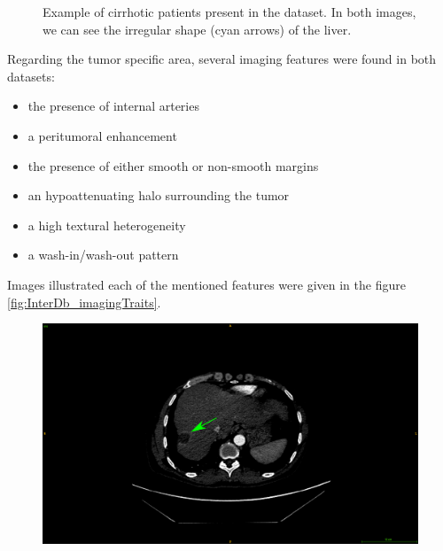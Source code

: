{\begin{figure}[!ht]
\begin{mdframed}[backgroundcolor=blue!50,linecolor=blue!50]
\begin{minipage}{0.45\linewidth}
		\end{minipage}
	\end{mdframed}
	\caption{Example of cirrhotic patients present in the \textbf{} dataset. In both images, we can see the irregular shape (cyan arrows) of the liver.}
	\label{fig:GDb_diseasedLivers}
\end{figure}
Regarding the tumor specific area, several imaging features were found in both datasets:
\begin{itemize}
\item the presence of internal arteries
\item a peritumoral enhancement
\item the presence of either smooth or non-smooth margins
\item an hypoattenuating halo surrounding the tumor
\item a high textural heterogeneity
\item a wash-in/wash-out pattern 
\end{itemize}
Images illustrated each of the mentioned features were given in the figure \ref{fig:InterDb_imagingTraits}.
\begin{figure}[!ht]
	\begin{mdframed}[backgroundcolor=blue!50,linecolor=blue!50]
		\centering
		\begin{minipage}{0.45\linewidth}
			\includegraphics[width=\linewidth]{images/ImagingTraits/ResizeGDB_peritumoralEnhancement}
		\end{minipage} \hspace{-0.1cm}
		\begin{minipage}{0.45\linewidth}

\end{minipage}
\end{mdframed}
\end{figure}}
